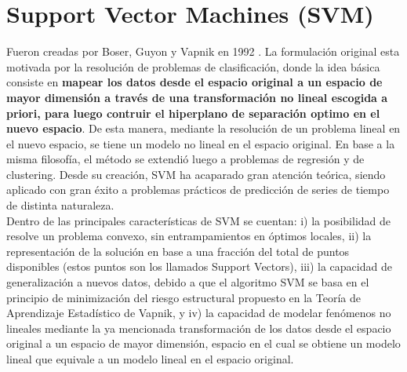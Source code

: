 \pagebreak\section{Support Vector Machines (SVM)}
	Fueron creadas por Boser, Guyon y Vapnik en 1992 \cite{boser1992training}. La formulaci\'on original esta motivada por la resoluci\'on de problemas de clasificaci\'on, donde la idea b\'asica consiste en \textbf{mapear los datos desde el espacio original a un espacio de mayor dimensi\'on a trav\'es de una transformaci\'on no lineal escogida a priori, para luego contruir el hiperplano de separaci\'on optimo en el nuevo espacio}. De esta manera, mediante la resoluci\'on de un problema lineal en el nuevo espacio, se tiene un modelo no lineal en el espacio original. 
	En base a la misma filosof\'{i}a, el m\'etodo se extendi\'o luego a problemas de regresi\'on y de clustering. Desde su creaci\'on, SVM ha acaparado gran atenci\'on te\'orica, siendo aplicado con gran \'exito a problemas pr\'acticos de predicci\'on de series de tiempo de distinta naturaleza. \\
	Dentro de las principales caracter\'{i}sticas de SVM se cuentan: i) la posibilidad de resolve un problema convexo, sin entrampamientos en \'optimos locales, ii) la representaci\'on de la soluci\'on en base a una fracci\'on del total de puntos disponibles (estos puntos son los llamados Support Vectors), iii) la capacidad de generalizaci\'on a nuevos datos, debido a que el algoritmo SVM se basa en el principio de minimizaci\'on del riesgo estructural propuesto en la Teor\'{i}a de Aprendizaje Estad\'{i}stico de Vapnik, y iv) la capacidad de modelar fen\'omenos no lineales mediante la ya mencionada transformaci\'on de los datos desde el espacio original a un espacio de mayor dimensi\'on, espacio en el cual se obtiene un modelo lineal que equivale a un modelo lineal en el espacio original.
